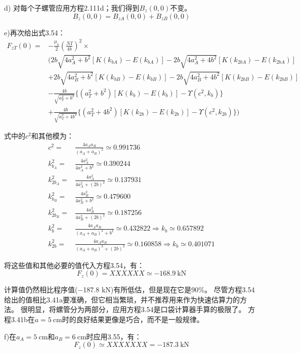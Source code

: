 d) 对每个子螺管应用方程2.111d；我们得到$B_z(0,0)$不变。
$$B_z(0,0) = B_{zA}(0,0) + B_{zB}(0,0)$$

e)再次给出式3.54：
\begin{align*}
F_{zT}(0)=&-\frac{\mu_{o}}{2}(\frac{NI}{4b})^{2}\times\\
&(2b\sqrt{4a_{A}^{2}+b^{2}}[K(k_{bA})-E(k_{bA})]-2b\sqrt{4a_{A}^{2}+4b^{2}}[K(k_{2bA})-E(k_{2bA})]\\
&+2b\sqrt{4a_{B}^{2}+b^{2}}[K(k_{bB})-E(k_{bB})]-2b\sqrt{4a_{B}^{2}+4b^{2}}[K(k_{2bB})-E(k_{2bB})]\\
&-\frac{4b}{\sqrt{a_{T}^{2}+b^{2}}}\{(a_{T}^{2}+b^{2})[K(k_{b})-E(k_{b})]-\Upsilon(c^{2},k_{b})\}\\
&+\frac{4b}{\sqrt{a_{T}^{2}+4b^{2}}}\{(a_{T}^{2}+4b^{2})[K(k_{2b})-E(k_{2b})]-\Upsilon(c^{2},k_{2b})\})\tag{3.54}
\end{align*}

式中的$c^2$和其他模为：
\begin{align*}
c^2=&\frac{4a_A a_B}{(a_A+a_B)^2}\simeq 0.991736\\
k_{b_A}^2=&\frac{4a_A^2}{4a_A^2+b^2}\simeq 0.390244\\
k_{2b_A}^2=&\frac{4a_A^2}{4a_A^2+(2b)^2}\simeq 0.137931\\
k_{b_B}^2=&\frac{4a_B^2}{4a_B^2+b^2}\simeq 0.479600\\
k_{2b_B}^2=&\frac{4a_B^2}{4a_B^2+(2b)^2}\simeq 0.187256\\
k_{b}^2=&\frac{4a_A a_B}{(a_A+a_B)^2+b^2}\simeq 0.432822\Rightarrow k_b\simeq 0.657892\\
k_{2b}^2=&\frac{4a_A a_B}{(a_A+a_B)^2+(2b)^2}\simeq 0.160858\Rightarrow k_b\simeq 0.401071 
\end{align*}

将这些值和其他必要的值代入方程3.54，有：
\begin{equation*}
F_z(0)= XXXXXX \simeq -168.9\ \mathrm{kN}
\end{equation*}

计算值仍然相比程序值(−187.8 kN)有所低估，但是现在它是90\%。
尽管方程3.54给出的值相比3.41a要准确，但它相当繁琐，并不推荐用来作为快速估算力的方法。
很明显，将螺管分为两部分，应用方程3.54是口袋计算器手算的极限了。
方程3.41b在$a=5\ \mathrm{cm}$时的良好结果更像是巧合，而不是一般规律。

f)在$a_A=5\ \mathrm{cm}$和$a_B=6\ \mathrm{cm}$时应用3.55，有：
\begin{equation*}
F_z(0)\simeq XXXXXXX = -187.3\ \mathrm{kN}
\end{equation*}

